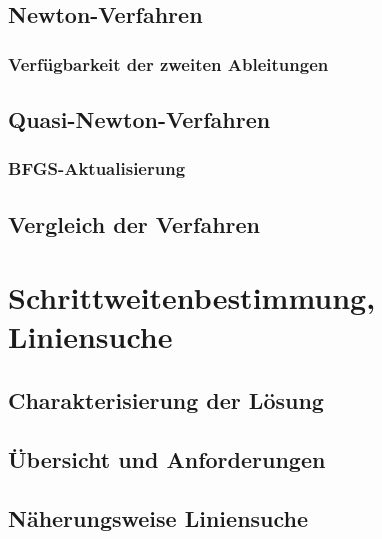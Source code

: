 		\subsection{Newton-Verfahren} %

			\subsubsection{Verfügbarkeit der zweiten Ableitungen} %

		\subsection{Quasi-Newton-Verfahren} %

			\subsubsection{BFGS-Aktualisierung} %

		\subsection{Vergleich der Verfahren} %

	\section{Schrittweitenbestimmung, Liniensuche} %

		\subsection{Charakterisierung der Lösung} %

		\subsection{Übersicht und Anforderungen} %

		\subsection{Näherungsweise Liniensuche} %

